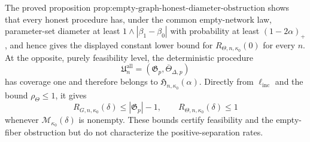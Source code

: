 The proved proposition \(\text{prop:empty-graph-honest-diameter-obstruction}\) shows that every honest procedure has, under the common empty-network law, parameter-set diameter at least \(1\wedge|\beta_1-\beta_0|\) with probability at least \((1-2\alpha)_+\), and hence gives the displayed constant lower bound for \(R_{\Theta,n,\kappa_0}(0)\) for every \(n\). At the opposite, purely feasibility level, the deterministic procedure
\[
 \mathfrak U_n^{\mathrm{all}}=(\mathfrak G_p,\overline\Theta_{\Delta,p})
\]
has coverage one and therefore belongs to \(\mathfrak H_{n,\kappa_0}(\alpha)\). Directly from \(\ell_{\mathrm{inc}}\) and the bound \(\rho_{\Theta}\leq1\), it gives
\[
 R_{G,n,\kappa_0}(\delta)\leq|\mathfrak G_p|-1,
 \qquad
 R_{\Theta,n,\kappa_0}(\delta)\leq1
\]
whenever \(\mathcal M_{\kappa_0}(\delta)\) is nonempty. These bounds certify feasibility and the empty-fiber obstruction but do not characterize the positive-separation rates.